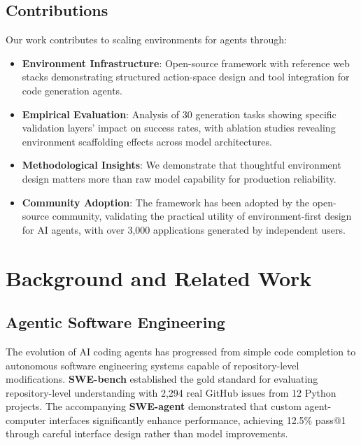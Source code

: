 \documentclass{article}
\begin{document}
\subsection{Contributions}

Our work contributes to scaling environments for agents through:

\begin{itemize}
\item \textbf{Environment Infrastructure}: Open-source framework with reference web stacks demonstrating structured action-space design and tool integration for code generation agents.
\item \textbf{Empirical Evaluation}: Analysis of 30 generation tasks showing specific validation layers' impact on success rates, with ablation studies revealing environment scaffolding effects across model architectures.
\item \textbf{Methodological Insights}: We demonstrate that thoughtful environment design matters more than raw model capability for production reliability.
\item \textbf{Community Adoption}: The framework has been adopted by the open-source community, validating the practical utility of environment-first design for AI agents, with over 3,000 applications generated by independent users.
\end{itemize}

\section{Background and Related Work}

\subsection{Agentic Software Engineering}

The evolution of AI coding agents has progressed from simple code completion to autonomous software engineering systems capable of repository-level modifications. \textbf{SWE-bench} \citep{jimenez2024swe} established the gold standard for evaluating repository-level understanding with 2,294 real GitHub issues from 12 Python projects. The accompanying \textbf{SWE-agent} \citep{yang2024swe} demonstrated that custom agent-computer interfaces significantly enhance performance, achieving 12.5\% pass@1 through careful interface design rather than model improvements.
\end{document}
